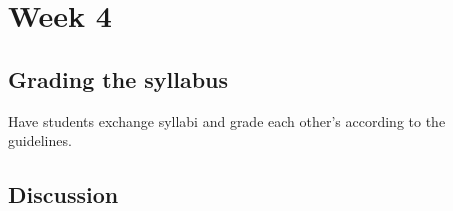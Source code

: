 
\section{Week 4}
\label{sec:week-4}

\subsection{Grading the syllabus}
\label{sec:grading-syllabus}

Have students exchange syllabi and grade each other's according to the guidelines.

\subsection{Discussion}
\label{sec:discussion}


